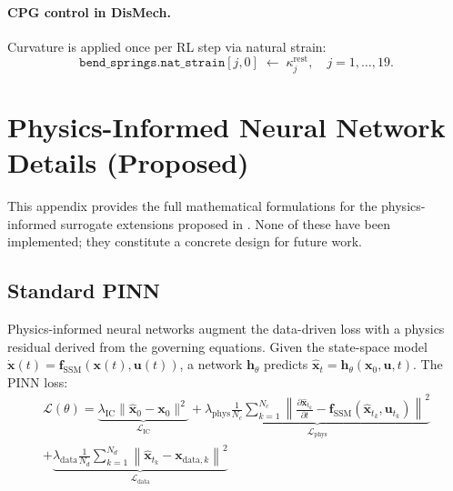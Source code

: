 \documentclass[11pt]{article}
\newcommand{\xhat}{\hat{\mathbf{x}}}
\newcommand{\fssm}{\mathbf{f}_{\mathrm{SSM}}}
\begin{document}
\paragraph{CPG control in DisMech.}
Curvature is applied once per RL step via natural strain:
\begin{equation}
  \texttt{bend\_springs.nat\_strain}[j, 0] \;\gets\; \kappa_j^{\text{rest}},
  \quad j = 1, \ldots, 19.
  \label{eq:dismech-control-cpg}
\end{equation}

\section{Physics-Informed Neural Network Details (Proposed)}
\label{app:pinn}

This appendix provides the full mathematical formulations for the physics-informed surrogate extensions proposed in .
None of these have been implemented; they constitute a concrete design for future work.

\subsection{Standard PINN}
\label{sec:pinn:standard}

Physics-informed neural networks \citep{Raissi2019} augment the data-driven loss with a physics residual derived from the governing equations.
Given the state-space model $\dot{\mathbf{x}}(t) = \fssm(\mathbf{x}(t), \mathbf{u}(t))$, a network $\mathbf{h}_\theta$ predicts
$\xhat_t = \mathbf{h}_\theta(\mathbf{x}_0, \mathbf{u}, t)$.
The PINN loss:
\begin{multline}
  \mathcal{L}(\theta)
    = \underbrace{\lambda_{\mathrm{IC}} \bigl\| \xhat_0 - \mathbf{x}_0 \bigr\|^2}_{\mathcal{L}_{\mathrm{IC}}}
    + \underbrace{\lambda_{\mathrm{phys}} \frac{1}{N_c}\sum_{k=1}^{N_c}
      \left\| \frac{\partial \xhat_{t_k}}{\partial t} - \fssm(\xhat_{t_k}, \mathbf{u}_{t_k}) \right\|^2}_{\mathcal{L}_{\mathrm{phys}}} \\
    + \underbrace{\lambda_{\mathrm{data}} \frac{1}{N_d}\sum_{k=1}^{N_d}
      \left\| \xhat_{t_k} - \mathbf{x}_{\mathrm{data},k} \right\|^2}_{\mathcal{L}_{\mathrm{data}}}
  \label{eq:pinn:loss}
\end{multline}
\end{document}
